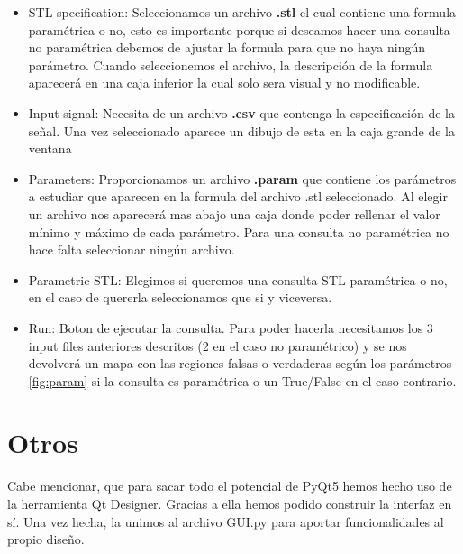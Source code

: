 \begin{itemize}
\item STL specification: Seleccionamos un archivo \textbf{.stl} el cual contiene una formula paramétrica o no, esto es importante porque si deseamos hacer una consulta no paramétrica debemos de ajustar la formula para que no haya ningún parámetro. Cuando seleccionemos el archivo, la descripción de la formula aparecerá en una caja inferior la cual solo sera visual y no modificable.

\item Input signal: Necesita de un archivo \textbf{.csv} que contenga la especificación de la señal. Una vez seleccionado aparece un dibujo de esta en la caja grande de la ventana

\item Parameters: Proporcionamos un archivo \textbf{.param} que contiene los parámetros a estudiar que aparecen en la formula del archivo .stl seleccionado. Al elegir un archivo nos aparecerá mas abajo una caja donde poder rellenar el valor mínimo y máximo de cada parámetro. Para una consulta no paramétrica no hace falta seleccionar ningún archivo.

\item Parametric STL: Elegimos si queremos una consulta STL paramétrica o no, en el caso de quererla seleccionamos que si y viceversa.

\item Run: Boton de ejecutar la consulta. Para poder hacerla necesitamos los 3 input files anteriores descritos (2 en el caso no paramétrico) y se nos devolverá un mapa con las regiones falsas o verdaderas según los parámetros \ref{fig:param} si la consulta es paramétrica o un True/False en el caso contrario. 
\end{itemize} 

\section{Otros}
Cabe mencionar, que para sacar todo el potencial de PyQt5 hemos hecho uso de la herramienta Qt Designer. Gracias a ella hemos podido construir la interfaz en sí. Una vez hecha, la unimos al archivo GUI.py para aportar funcionalidades al propio diseño.
